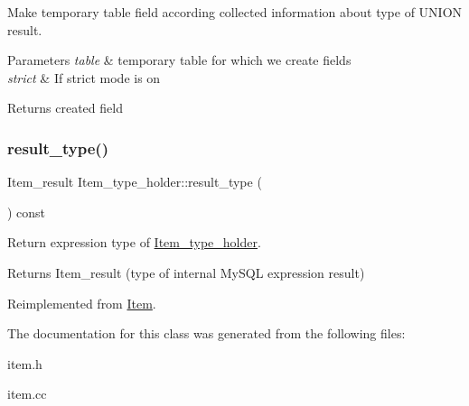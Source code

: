 Make temporary table field according collected information about type of U\+N\+I\+ON result.


\begin{DoxyParams}{Parameters}
{\em table} & temporary table for which we create fields \\
\hline
{\em strict} & If strict mode is on\\
\hline
\end{DoxyParams}
\begin{DoxyReturn}{Returns}
created field 
\end{DoxyReturn}
\mbox{\label{classItem__type__holder_a5f84662e32ecbc99e401efbda856f791}} 
\subsubsection{\texorpdfstring{result\+\_\+type()}{result\_type()}}
{\footnotesize\ttfamily Item\+\_\+result Item\+\_\+type\+\_\+holder\+::result\+\_\+type (\begin{DoxyParamCaption}{ }\end{DoxyParamCaption}) const\hspace{0.3cm}{\ttfamily [virtual]}}

Return expression type of \mbox{\hyperlink{classItem__type__holder}{Item\+\_\+type\+\_\+holder}}.

\begin{DoxyReturn}{Returns}
Item\+\_\+result (type of internal My\+S\+QL expression result) 
\end{DoxyReturn}


Reimplemented from \mbox{\hyperlink{classItem}{Item}}.



The documentation for this class was generated from the following files\+:\begin{DoxyCompactItemize}
\item 
item.\+h\item 
item.\+cc\end{DoxyCompactItemize}

